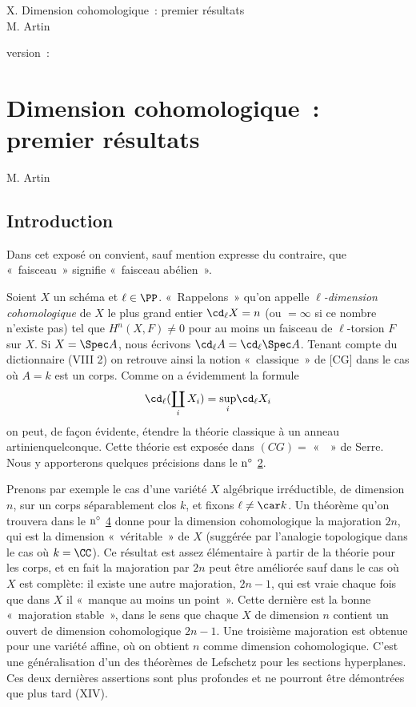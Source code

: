 \documentclass[10pt]{../fichiers-configuration-latex/smfart}
\begin{document}
\begin{center}
X. Dimension cohomologique : premier résultats\\
M. Artin
\end{center}

version : \showgitstatus{}
\tableofcontents

\else
\chapter{Dimension cohomologique : premier résultats}
\begin{center}
M. Artin
\end{center}
\fi

\setcounter{pageoriginal}{42}

\section{Introduction}\pageoriginale

Dans cet exposé on convient, sauf mention expresse du contraire, que
« faisceau » signifie « faisceau abélien ».

Soient $X$ un schéma et $\ell\in \PP$. « Rappelons » qu'on appelle
\emph{$\ell$-dimension cohomologique} de $X$ le plus grand entier
$\cd_{\ell}X=n$ (ou $=\infty$ si ce nombre n'existe pas) tel que
$H^n(X,F)\neq 0$ pour au moins un faisceau de $\ell$-torsion $F$ sur
$X$. Si $X=\Spec A$, nous écrivons $\cd_{\ell} A=\cd_{\ell}\Spec
A$. Tenant compte du dictionnaire (VIII 2) %
on retrouve ainsi la notion « classique » de [CG] dans le cas où $A=k$ est un corps. Comme on
a évidemment la formule
$$
\cd_{\ell}(\coprod_i X_i)=\displaystyle{\mathop{\sup}_i} \cd_{\ell}X_i
$$
on peut, de façon évidente, étendre la théorie classique à un
anneau artinien\pageoriginale quelconque. Cette théorie est exposée dans
$(CG)=$ «  » %
de Serre. Nous y apporterons quelques précisions dans le ${\rm n^{\circ}}$ \hyperref[X.sec2]{2}.

Prenons par exemple le cas d'une variété $X$ algébrique irréductible,
de dimension $n$, sur un corps séparablement clos $k$, et fixons
$\ell\neq \car k$. Un théorème qu'on trouvera dans le ${\rm
  n^{\circ}}$ \hyperref[X.sec4]{4} donne pour la dimension cohomologique la majoration
$2n$, qui est la dimension « véritable » de $X$ (suggérée par
l'analogie topologique dans le cas où $k=\CC$). Ce résultat est
assez élémentaire à partir de la théorie pour les corps, et en fait la
majoration par $2n$ peut être améliorée sauf dans le cas où $X$ est
complète: il existe une autre majoration, $2n-1$, qui est vraie chaque
fois que dans $X$ il « manque au moins un point ». Cette dernière
est la bonne « majoration stable », dans le sens que chaque $X$ de
dimension $n$ contient un ouvert de dimension cohomologique
$2n-1$. Une troisième majoration est obtenue pour une variété affine,
où on obtient $n$ comme dimension cohomologique. C'est une
généralisation d'un des théorèmes de Lefschetz pour les sections
hyperplanes. Ces deux dernières assertions sont plus profondes et ne
pourront être démontrées que plus tard (XIV).
\end{document}
